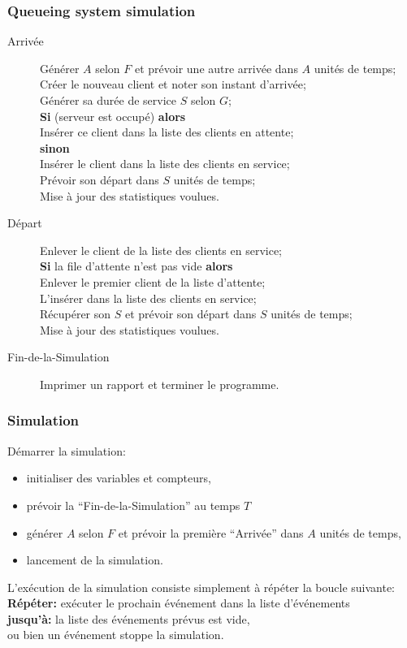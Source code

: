 \documentclass[t,usepdftitle=false]{beamer}
\begin{document}
\begin{frame}
\frametitle{Queueing system simulation}

\begin{small}
\begin{description}
\item[Arrivée]
Générer $A$ selon $F$ et prévoir une autre arrivée 
    dans $A$ unités de temps;\\
Créer le nouveau client et noter son instant d'arrivée;\\
Générer sa durée de service $S$ selon $G$;\\
{\bf Si} (serveur est occupé) {\bf alors}\\
\quad Insérer ce client dans la liste des clients en attente;\\
{\bf sinon}\\
\quad   Insérer le client dans la liste des clients en service;\\
\quad   Prévoir son départ dans $S$ unités de temps; \\
Mise à jour des statistiques voulues.
\item[Départ]
Enlever le client de la liste des clients en service;\\
{\bf Si} la file d'attente n'est pas vide {\bf alors}\\
\quad  Enlever le premier client de la liste d'attente;\\
\quad  L'insérer dans la liste des clients en service;\\
\quad  Récupérer son $S$ et prévoir son départ dans 
       $S$ unités de temps;\\
Mise à jour des statistiques voulues.
\item[Fin-de-la-Simulation]
Imprimer un rapport et terminer le programme.
\end{description}
\end{small}
\end{frame}

\begin{frame}
\frametitle{Simulation}

Démarrer la simulation:
\begin{itemize}
\item
initialiser des variables et compteurs,
\item
prévoir la ``Fin-de-la-Simulation'' au temps $T$
\item
générer $A$ selon $F$ et prévoir la première ``Arrivée'' dans $A$ unités de temps,
\item
lancement de la simulation.
\end{itemize}

\mbox{}

L'exécution de la simulation consiste simplement à répéter la boucle
suivante:\\
{\bf Répéter:} exécuter le prochain événement
     dans la liste d'événements\\
{\bf jusqu'à:} la liste des événements prévus est vide,\\
\quad    ou bien un événement stoppe la simulation.

\end{frame}
\end{document}
